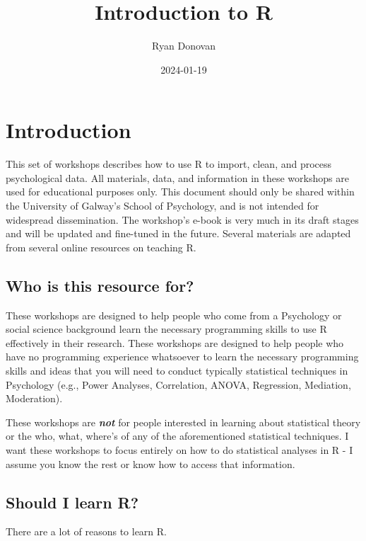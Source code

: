 \documentclass[
]{book}
\title{Introduction to R}
\author{Ryan Donovan}
\date{2024-01-19}
\begin{document}
\maketitle

{
\setcounter{tocdepth}{1}
\tableofcontents
}
\hypertarget{introduction}{%
\chapter{Introduction}\label{introduction}}

This set of workshops describes how to use R to import, clean, and process psychological data. All materials, data, and information in these workshops are used for educational purposes only. This document should only be shared within the University of Galway's School of Psychology, and is not intended for widespread dissemination. The workshop's e-book is very much in its draft stages and will be updated and fine-tuned in the future. Several materials are adapted from several online resources on teaching R.

\hypertarget{who-is-this-resource-for}{%
\section{Who is this resource for?}\label{who-is-this-resource-for}}

These workshops are designed to help people who come from a Psychology or social science background learn the necessary programming skills to use R effectively in their research. These workshops are designed to help people who have no programming experience whatsoever to learn the necessary programming skills and ideas that you will need to conduct typically statistical techniques in Psychology (e.g., Power Analyses, Correlation, ANOVA, Regression, Mediation, Moderation).

These workshops are \textbf{\emph{not}} for people interested in learning about statistical theory or the who, what, where's of any of the aforementioned statistical techniques. I want these workshops to focus entirely on how to do statistical analyses in R - I assume you know the rest or know how to access that information.

\hypertarget{should-i-learn-r}{%
\section{Should I learn R?}\label{should-i-learn-r}}

There are a lot of reasons to learn R.
\end{document}
